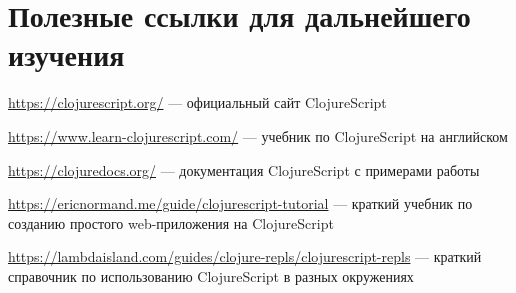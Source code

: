 \section*{Полезные ссылки для дальнейшего изучения}

\url{https://clojurescript.org/} ---  официальный сайт ClojureScript

\url{https://www.learn-clojurescript.com/} --- учебник по ClojureScript на английском

\url{https://clojuredocs.org/} ---  документация ClojureScript с примерами работы

\url{https://ericnormand.me/guide/clojurescript-tutorial} --- краткий учебник по созданию простого  web-приложения на ClojureScript

\url{https://lambdaisland.com/guides/clojure-repls/clojurescript-repls} --- краткий справочник по использованию ClojureScript в разных окружениях


